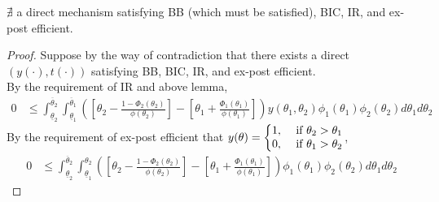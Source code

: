 \documentclass[11pt]{elegantbook}
\begin{document}
\begin{theorem}
    $\nexists$ a direct mechanism satisfying BB (which must be satisfied), BIC, IR, and ex-post efficient.
\end{theorem}
\begin{proof}
    Suppose by the way of contradiction that there exists a direct $(y(\cdot),t(\cdot))$ satisfying BB, BIC, IR, and ex-post efficient.\\
    By the requirement of IR and above lemma,
    \begin{equation}
        \begin{aligned}
            0&\leq \int_{\underline{\theta}_2}^{\overline{\theta}_2}\int_{\underline{\theta}_1}^{\overline{\theta}_1} \left(\left[\theta_2-\frac{1-\Phi_2(\theta_2)}{\phi(\theta_2)}\right]-\left[\theta_1+\frac{\Phi_1(\theta_1)}{\phi(\theta_1)}\right]\right)y(\theta_1,\theta_2)\phi_1(\theta_1)\phi_2(\theta_2)d\theta_1d\theta_2
        \end{aligned}
        \nonumber
    \end{equation}
    By the requirement of ex-post efficient that $y(\theta)=\left\{\begin{matrix}
        1,& \textnormal{ if }\theta_2>\theta_1\\
        0,& \textnormal{ if }\theta_1>\theta_2
    \end{matrix}\right.$,
    \begin{equation}
        \begin{aligned}
            0&\leq \int_{\underline{\theta}_2}^{\overline{\theta}_2}\int_{\underline{\theta}_1}^{\theta_2} \left(\left[\theta_2-\frac{1-\Phi_2(\theta_2)}{\phi(\theta_2)}\right]-\left[\theta_1+\frac{\Phi_1(\theta_1)}{\phi(\theta_1)}\right]\right)\phi_1(\theta_1)\phi_2(\theta_2)d\theta_1d\theta_2
        \end{aligned}
        \nonumber
    \end{equation}
\end{proof}
\end{document}
